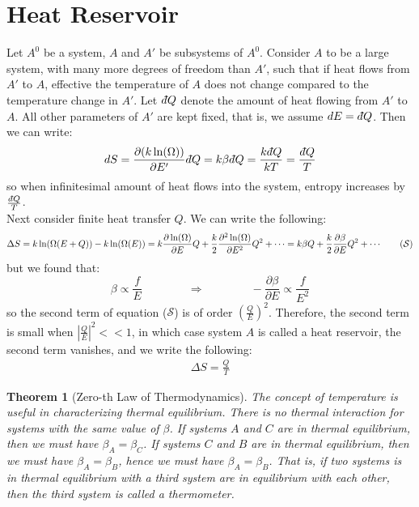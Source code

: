 \documentclass[11pt,oneside]{book}
\theoremstyle{break}
\theoremstyle{break}
\newtheorem{thm}{Theorem}[section]
\newcommand{\dbar}{d\hspace*{-0.08em}\bar{}\hspace*{0.1em}}
\begin{document}
\section[Heat Reservoir]{\color{red} Heat Reservoir\color{black}}
Let $A^0$ be a system, $A$ and $A'$ be subsystems of $A^0$. Consider $A$ to be a large system, with many more degrees of freedom than $A'$, such that if heat flows from $A'$ to $A$, effective the temperature of $A$ does not change compared to the temperature change in $A'$. Let $\dbar Q$ denote the amount of heat flowing from $A'$ to $A$. All other parameters of $A'$ are kept fixed, that is, we assume $dE = \dbar Q$. Then we can write:
\begin{align*}
dS = \frac{\partial (k\ln(\Omega))}{\partial E'} \dbar Q = k \beta \dbar Q = \frac{k\dbar Q}{kT} = \frac{\dbar Q}{T}
\end{align*}
so when infinitesimal amount of heat flows into the system, entropy increases by $\frac{\dbar Q}{T}$. \\
Next consider finite heat transfer $Q$. We can write the following:
\begin{align*}
\Delta S = k\ln(\Omega(E+Q)) - k\ln(\Omega(E)) = k\frac{\partial \ln(\Omega)}{\partial E} Q + \frac{k}{2}  \frac{\partial^2 \ln(\Omega)}{\partial E^2}Q^2 + \cdots = k\beta Q + \frac{k}{2}\frac{\partial \beta}{\partial E} Q^2+\cdots  \tag{$\mathcal{S}$}
\end{align*}
but we found that: $$\beta \propto \frac{f}{E} \qquad \qquad \Rightarrow \qquad\qquad -\frac{\partial \beta}{\partial E} \propto \frac{f}{E^2}$$ 
so the second term of equation ($\mathcal{S}$) is of order $\left(\frac{Q}{E}\right)^2$. Therefore, the second term is small when $|\frac{Q}{E}|^2 <<1$, in which case system $A$ is called a heat reservoir, the second term vanishes, and we write the following:
\begin{align*}
 \Delta S = \frac{Q}{T}
\end{align*}


\begin{thm}[Zero-th Law of Thermodynamics]
The concept of temperature is useful in characterizing thermal equilibrium. There is no thermal interaction for systems with the same value of $\beta$. If systems $A$ and $C$ are in thermal equilibrium, then we must have $\beta_A = \beta_C$. If systems $C$ and $B$ are in thermal equilibrium, then we must have $\beta_A = \beta_B$, hence we must have $\beta_A = \beta_B$. That is, if two systems is in thermal equilibrium with a third system are in equilibrium with each other, then the third system is called a thermometer. 
\end{thm}
\newpage
\end{document}
